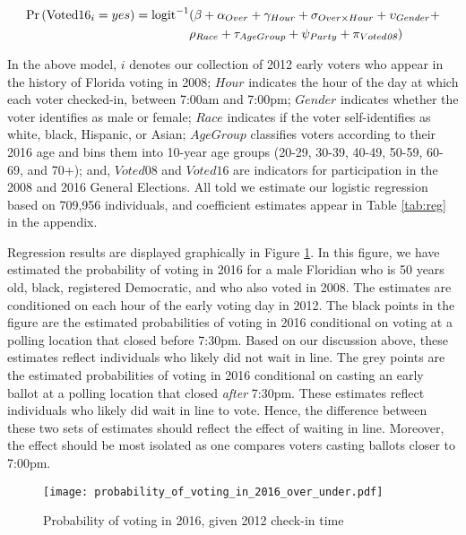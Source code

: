 \documentclass[12pt,titlepage]{article}
\begin{document}
\begin{equation*}
  \begin{aligned}
    \textup{Pr}\left(\mathrm{Voted16}_{i} = yes\right) =  \textup{logit}^{-1}&(\beta + \alpha_{Over} + \gamma_{Hour} +
    \sigma_{Over \times Hour} + \upsilon_{Gender}  + \\& \rho_{Race} +
      \tau_{Age Group} + \psi_{Party} + \pi_{Voted\emph{08}})
  \end{aligned}
\end{equation*}

In the above model, $i$ denotes our collection of 2012 early voters
who appear in the history of Florida voting in 2008; $Hour$ indicates
the hour of the day at which each voter checked-in, between 7:00am and
7:00pm; $Gender$ indicates whether the voter identifies as male or
female; $Race$ indicates if the voter self-identifies as white, black,
Hispanic, or Asian; $AgeGroup$ classifies voters according to their
2016 age and bins them into 10-year age groups (20-29, 30-39, 40-49,
50-59, 60-69, and 70+); and, $Voted08$ and $Voted16$ are indicators
for participation in the 2008 and 2016 General Elections.  All told we
estimate our logistic regression based on 709,956 individuals, and
coefficient estimates appear in Table \ref{tab:reg} in the appendix.

Regression results are displayed graphically in Figure
\ref{fig:prvoting2016}. In this figure, we have estimated the
probability of voting in 2016 for a male Floridian who is 50 years
old, black, registered Democratic, and who also voted in 2008.  The
estimates are conditioned on each hour of the early voting day in
2012. The black points in the figure are the estimated probabilities
of voting in 2016 conditional on voting at a polling location that
closed before 7:30pm.  Based on our discussion above, these estimates
reflect individuals who likely did not wait in line.  The grey points
are the estimated probabilities of voting in 2016 conditional on
casting an early ballot at a polling location that closed \emph{after}
7:30pm.  These estimates reflect individuals who likely did wait in
line to vote.  Hence, the difference between these two sets of
estimates should reflect the effect of waiting in line.  Moreover, the
effect should be most isolated as one compares voters casting ballots
closer to 7:00pm.

\begin{figure}[!ht]
\caption{Probability of voting in 2016, given 2012 check-in time}
  \label{fig:prvoting2016}
  \centering
    \centering\texttt{[image: probability\_of\_voting\_in\_2016\_over\_under.pdf]}
\end{figure}
\end{document}
